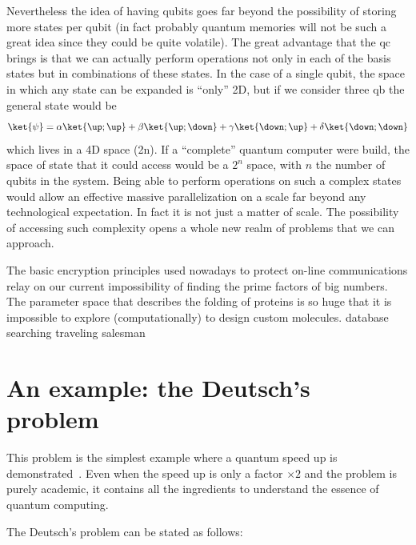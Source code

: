Nevertheless the idea of having qubits goes far beyond the possibility of storing more states per qubit (in fact probably quantum memories will not be such a great idea since they could be quite volatile).
The great advantage that the \ac{qc} brings is that we can actually perform operations not only in each of the basis states but in combinations of these states\cite{DiVincenzo2000}. In the case of a single qubit, the space in which any state can be expanded is ``only'' 2D, but if we consider three \ac{qb} the general state would be
\begin{equation}
  \ket{\psi} = \alpha\ket{\up;\up} + \beta\ket{\up;\down} +
               \gamma\ket{\down;\up} + \delta\ket{\down;\down}
\end{equation}
which lives in a 4D space (2n).
If a ``complete'' quantum computer were build, the space of state that it could access would be a $2^n$ space, with $n$ the number of qubits in the system. Being able to perform operations on such a complex states would allow an effective massive parallelization on a scale far beyond any technological expectation.
In fact it is not just a matter of scale. The possibility of accessing such complexity opens a whole new realm of problems that we can approach.

The basic encryption principles used nowadays to protect on-line communications relay on our current impossibility of finding the prime factors of big numbers\cite{Shor1994}.
The parameter space that describes the folding of proteins is so huge that it is impossible to explore (computationally) to design custom molecules.\cite{Lanyon2009}
database searching\cite{Grover1997}
traveling salesman\cite{Goswami2004, Moylett2017}




\section{An example: the Deutsch's problem}
This problem is the simplest example where a quantum speed up is demonstrated~\cite{Deutsch1992}. Even when the speed up is only a factor $\times2$ and the problem is purely academic, it contains all the ingredients to understand the essence of quantum computing.

The Deutsch's problem can be stated as follows:

